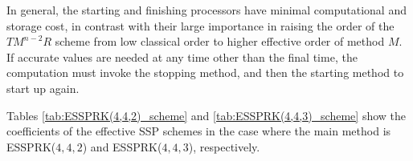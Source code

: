 In general, the starting and finishing processors have minimal computational and storage cost, 
in contrast with their large importance in raising the order of the $TM^{n-2}R$ scheme from low 
classical order to higher effective order of method $M$.
If accurate values are needed at any time other than the final time, the computation must invoke 
the stopping method, and then the starting method to start up again. 

Tables \ref{tab:ESSPRK(4,4,2)_scheme} and \ref{tab:ESSPRK(4,4,3)_scheme} show the coefficients 
of the effective SSP schemes in the case where the main method is ESSPRK($4,4,2$) and 
ESSPRK($4,4,3$), respectively. 

